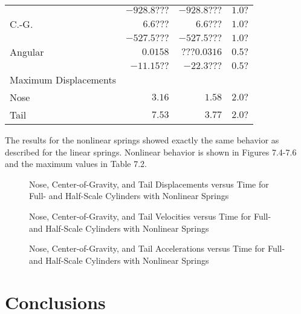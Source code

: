 \begin{table}
\begin{center}
\begin{tabular}{||l|r|r|r||}
         &$-928.8???$ &$-928.8???$ &$1.0?$\\
\quad   C.-G. &$6.6???$ &$6.6???$ &$1.0?$\\
         &$-527.5???$ &$-527.5???$ &$1.0?$\\
\quad Angular &$0.0158$ &$???0.0316$ &$0.5?$\\
         &$-11.15??$ &$-22.3???$ &$0.5?$\\
Maximum Displacements & & & \\
\quad    Nose &$3.16$ &$1.58$ &$2.0?$\\
\quad    Tail &$7.53$ &$3.77$ &$2.0?$\\
\hline
\end{tabular}
\end{center}
\end{table}

     The results for the nonlinear springs showed exactly the same 
behavior as described for the linear springs.  Nonlinear behavior is 
shown in Figures 7.4-7.6 and the maximum values in Table 7.2.

\begin{figure}
\vspace{3.5 in}
\caption{Nose, Center-of-Gravity, and Tail Displacements versus Time 
for Full- and Half-Scale Cylinders with Nonlinear Springs}
\end{figure}

\begin{figure}
\vspace{3.5 in}
\caption{Nose, Center-of-Gravity, and Tail Velocities versus Time 
for Full- and Half-Scale Cylinders with Nonlinear Springs}
\end{figure}

\begin{figure}
\vspace{3.5 in}
\caption{Nose, Center-of-Gravity, and Tail Accelerations versus Time 
for Full- and Half-Scale Cylinders with Nonlinear Springs}
\end{figure}

\section{Conclusions}

